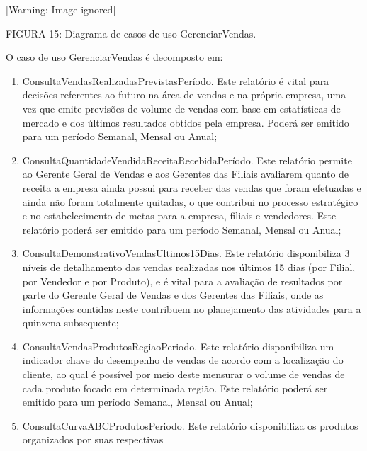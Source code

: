 \documentclass[a4paper]{article}
\newcommand\liststyleWWviiiNumxv{%
\renewcommand\theenumi{\alph{enumi}}
\renewcommand\theenumii{\alph{enumii}}
\renewcommand\theenumiii{\roman{enumiii}}
\renewcommand\theenumiv{\arabic{enumiv}}
\renewcommand\labelenumi{\theenumi)}
\renewcommand\labelenumii{\theenumii.}
\renewcommand\labelenumiii{\theenumiii.}
\renewcommand\labelenumiv{\theenumiv.}
}
\begin{document}
\bigskip

  [Warning: Image ignored] %
 

{
\textsf{\MakeUppercase{FIGURA 15}}\textsf{: Diagrama de casos de uso GerenciarVendas.}}

{
\textsf{O caso de uso GerenciarVendas \'e decomposto em:}}

\liststyleWWviiiNumxv
\begin{enumerate}
\item {
\textsf{ConsultaVendasRealizadasPrevistasPer\'iodo. Este relat\'orio \'e vital para decis\~oes referentes ao futuro na
\'area de vendas e na pr\'opria empresa, uma vez que emite previs\~oes de volume de vendas com base em estat\'isticas
de mercado e dos \'ultimos resultados obtidos pela empresa. Poder\'a ser emitido para um per\'iodo Semanal, Mensal ou
Anual;}}
\item {
\textsf{ConsultaQuantidadeVendidaReceitaRecebidaPer\'iodo. Este relat\'orio permite ao Gerente Geral de Vendas e aos
Gerentes das Filiais avaliarem quanto de receita a empresa ainda possui para receber das vendas que foram efetuadas e
ainda n\~ao foram totalmente quitadas, o que contribui no processo estrat\'egico e no estabelecimento de metas para a
empresa, filiais e vendedores. Este relat\'orio poder\'a ser emitido para um per\'iodo Semanal, Mensal ou Anual;}}
\item {
\textsf{ConsultaDemonstrativoVendasUltimos15Dias. Este relat\'orio disponibiliza 3 n\'iveis de detalhamento das vendas
realizadas nos \'ultimos 15 dias (por Filial, por Vendedor e por Produto), e \'e vital para a avalia\c{c}\~ao de
resultados por parte do Gerente Geral de Vendas e dos Gerentes das Filiais, onde as informa\c{c}\~oes }\textsf{contidas
neste contribuem no planejamento das atividades para a quinzena subsequente;}}
\item {
\textsf{ConsultaVendasProdutosRegiaoPeriodo. Este relat\'orio disponibiliza um indicador chave do desempenho de vendas
de acordo com a localiza\c{c}\~ao do cliente, ao qual \'e poss\'ivel por meio deste mensurar o volume de vendas de cada
produto focado em determinada regi\~ao. Este relat\'orio poder\'a ser emitido para um per\'iodo Semanal, Mensal ou
Anual;}}
\item {
\textsf{ConsultaCurvaABCProdutosPeriodo. Este relat\'orio disponibiliza os produtos organizados por suas respectivas
}}
\end{enumerate}
\end{document}
